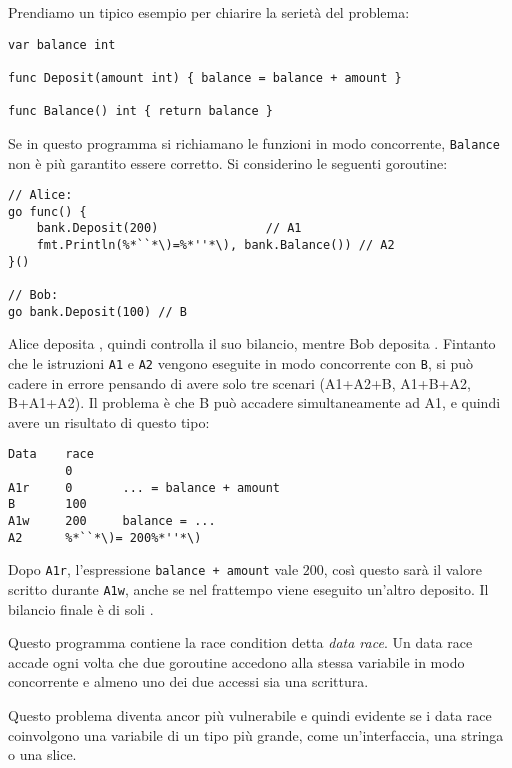 Prendiamo un tipico esempio per chiarire la serietà del problema:
\begin{lstlisting}[frame=single, label={lst:lstlisting9-1.1}]
var balance int

func Deposit(amount int) { balance = balance + amount }

func Balance() int { return balance }
\end{lstlisting}
Se in questo programma si richiamano le funzioni in modo concorrente, \verb|Balance| non è più garantito essere corretto.
Si considerino le seguenti goroutine:
\begin{lstlisting}[frame=single, label={lst:lstlisting9-1.2}]
// Alice:
go func() {
    bank.Deposit(200)               // A1
    fmt.Println(%*``*\)=%*''*\), bank.Balance()) // A2
}()

// Bob:
go bank.Deposit(100) // B
\end{lstlisting}
Alice deposita , quindi controlla il suo bilancio, mentre Bob deposita .
Fintanto che le istruzioni \verb|A1| e \verb|A2| vengono eseguite in modo concorrente con \verb|B|, si può cadere in errore pensando di avere solo tre scenari (A1+A2+B, A1+B+A2, B+A1+A2).
Il problema è che B può accadere simultaneamente ad A1, e quindi avere un risultato di questo tipo:
\begin{lstlisting}[label={lst:lstlisting9-1.3}]
Data	race
        0
A1r     0       ... = balance + amount
B       100
A1w     200     balance = ...
A2      %*``*\)= 200%*''*\)
\end{lstlisting}
Dopo \verb|A1r|, l'espressione \verb|balance + amount| vale $200$, così questo sarà il valore scritto durante \verb|A1w|, anche se nel frattempo viene eseguito un'altro deposito.
Il bilancio finale è di soli .

Questo programma contiene la race condition detta \textit{data race}.
Un data race accade ogni volta che due goroutine accedono alla stessa variabile in modo concorrente e almeno uno dei due accessi sia una scrittura.

Questo problema diventa ancor più vulnerabile e quindi evidente se i data race coinvolgono una variabile di un tipo più grande, come un'interfaccia, una stringa o una slice.

